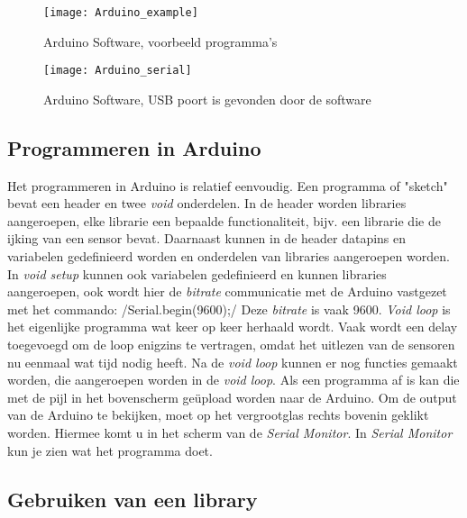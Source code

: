 \begin{figure}
    \centering
    \texttt{[image: Arduino\_example]}
    \caption{Arduino Software, voorbeeld programma's}
   \label{fig:Arduino_example}
\end{figure}

\begin{figure}
    \centering
    \texttt{[image: Arduino\_serial]}
    \caption{Arduino Software, USB poort is gevonden door de software}
    \label{fig:Arduino_serial}
\end{figure}


\subsection{Programmeren in Arduino}

Het programmeren in Arduino is relatief eenvoudig. Een programma of
"sketch" bevat een header en twee \emph{void} onderdelen. In de header
worden libraries aangeroepen, elke librarie een bepaalde
functionaliteit, bijv. een librarie die de ijking van een sensor bevat.
Daarnaast kunnen in de header datapins en variabelen gedefinieerd worden
en onderdelen van libraries aangeroepen worden. In \emph{void setup}
kunnen ook variabelen gedefinieerd en kunnen libraries aangeroepen, ook
wordt hier de \emph{bitrate} communicatie met de Arduino vastgezet met
het commando:  /Serial.begin(9600);/ Deze \emph{bitrate} is vaak 9600.
\emph{Void loop} is het eigenlijke programma wat keer op keer herhaald
wordt. Vaak wordt een delay toegevoegd om de loop enigzins te vertragen,
omdat het uitlezen van de sensoren nu eenmaal wat tijd nodig heeft. Na
de \emph{void loop} kunnen er nog functies gemaakt worden, die
aangeroepen worden in de \emph{void loop}. Als een programma af is kan
die met de pijl in het bovenscherm ge\"{u}pload worden naar de Arduino.
Om de output van de Arduino te bekijken, moet op het vergrootglas rechts
bovenin geklikt worden. Hiermee komt u in het scherm van de \emph{Serial
Monitor}. In \emph{Serial Monitor} kun je zien wat het programma doet.


\subsection{Gebruiken van een library}

